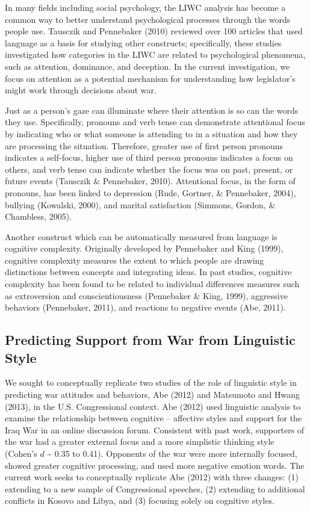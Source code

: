 \documentclass[
  english,
  ,man,floatsintext]{apa6}
\begin{document}
In many fields including social psychology, the LIWC analysis has become a common way to better understand psychological processes through the words people use. Tausczik and Pennebaker (2010) reviewed over 100 articles that used language as a basis for studying other constructs; specifically, these studies investigated how categories in the LIWC are related to psychological phenomena, such as attention, dominance, and deception. In the current investigation, we focus on attention as a potential mechanism for understanding how legislator's might work through decisions about war.

Just as a person's gaze can illuminate where their attention is so can the words they use. Specifically, pronouns and verb tense can demonstrate attentional focus by indicating who or what someone is attending to in a situation and how they are processing the situation. Therefore, greater use of first person pronouns indicates a self-focus, higher use of third person pronouns indicates a focus on others, and verb tense can indicate whether the focus was on past, present, or future events (Tausczik \& Pennebaker, 2010). Attentional focus, in the form of pronouns, has been linked to depression (Rude, Gortner, \& Pennebaker, 2004), bullying (Kowalski, 2000), and marital satisfaction (Simmons, Gordon, \& Chambless, 2005).

Another construct which can be automatically measured from language is cognitive complexity. Originally developed by Pennebaker and King (1999), cognitive complexity measures the extent to which people are drawing distinctions between concepts and integrating ideas. In past studies, cognitive complexity has been found to be related to individual differences measures such as extroversion and conscientiousness (Pennebaker \& King, 1999), aggressive behaviors (Pennebaker, 2011), and reactions to negative events (Abe, 2011).

\hypertarget{predicting-support-from-war-from-linguistic-style}{%
\subsection{Predicting Support from War from Linguistic Style}\label{predicting-support-from-war-from-linguistic-style}}

We sought to conceptually replicate two studies of the role of linguistic style in predicting war attitudes and behaviors, Abe (2012) and Matsumoto and Hwang (2013), in the U.S. Congressional context. Abe (2012) used linguistic analysis to examine the relationship between cognitive -- affective styles and support for the Iraq War in an online discussion forum. Consistent with past work, supporters of the war had a greater external focus and a more simplistic thinking style (Cohen's \(d\) \textasciitilde{} 0.35 to 0.41). Opponents of the war were more internally focused, showed greater cognitive processing, and used more negative emotion words. The current work seeks to conceptually replicate Abe (2012) with three changes: (1) extending to a new sample of Congressional speeches, (2) extending to additional conflicts in Kosovo and Libya, and (3) focusing solely on cognitive styles.
\end{document}
